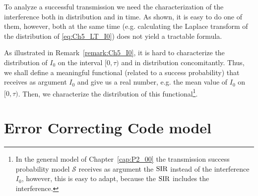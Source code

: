 \begin{remark}
    To analyze a successful transmission we need the characterization of the interference both in distribution and in time. As shown, it is easy to do one of them, however, both at the same time (e.g. calculating the Laplace transform of the distribution of \eqref{eq:Ch5_LT_I0}) does not yield a tractable formula.
\end{remark}

As illustrated in Remark~\ref{remark:Ch5_I0}, it is hard to characterize the distribution of $I_0$ on the interval $[0,\tau)$ and in distribution concomitantly.
%
Thus, we shall define a meaningful functional (related to a success probability) that receives as argument $I_0$ and give us a real number, e.g. the mean value of $I_0$ on $[0,\tau)$.
%
Then, we characterize the distribution of this functional\footnote{In the general model of Chapter~\ref{cap:P2_00} the transmission success probability model $\mathscr{S}$ receives as argument the $\mathrm{SIR}$ instead of the interference $I_0$, however, this is easy to adapt, because the $\mathrm{SIR}$ includes the interference.}.

\section{Error Correcting Code model}

